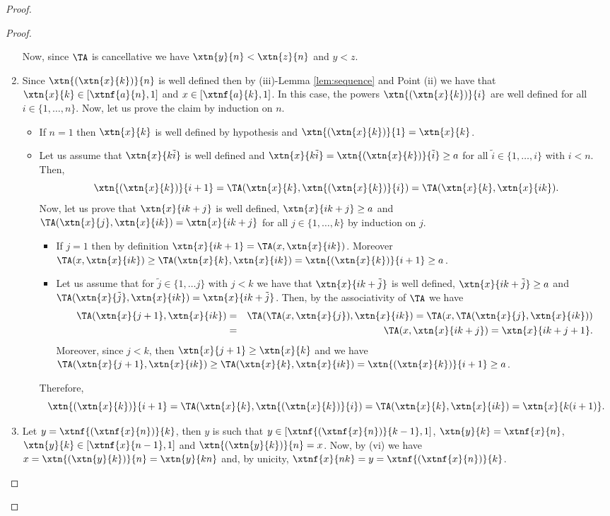 \begin{proof}
\begin{proof}
\begin{enumerate}[label=(\roman*)]
			Now, since $\TA$ is cancellative we have $\xtn{y}{n} < \xtn{z}{n}$ and $y<z$.
			\item Since $\xtn{(\xtn{x}{k})}{n}$ is well defined then by (iii)-Lemma \ref{lem:sequence} and Point (ii) we have that $\xtn{x}{k} \in [\xtnf{a}{n},1]$ and $x \in [\xtnf{a}{k},1]$. In this case, the powers $\xtn{(\xtn{x}{k})}{i}$ are well defined for all $i \in \{1,\dots,n\}$. Now, let us prove the claim by induction on $n$.
			\begin{itemize}
				\item If $n=1$ then  $\xtn{x}{k}$ is well defined by hypothesis and $\xtn{(\xtn{x}{k})}{1} = \xtn{x}{k}$.
				\item Let us assume that  $\xtn{x}{k\tilde{i}}$ is well defined and $\xtn{x}{k\tilde{i}} = \xtn{(\xtn{x}{k})}{\tilde{i}} \geq a$ for all $\tilde{i} \in \{1, \dots, i\}$ with $i <n$. Then,
				$$\xtn{(\xtn{x}{k})}{i+1} = \TA(\xtn{x}{k},\xtn{(\xtn{x}{k})}{i}) = \TA(\xtn{x}{k},\xtn{x}{ik}).$$
				Now, let us prove that $\xtn{x}{ik+j}$ is well defined, $\xtn{x}{ik+j} \geq a$ and $\TA(\xtn{x}{j}, \xtn{x}{ik}) = \xtn{x}{ik+j}$ for all $j \in \{1,\dots, k\}$ by induction on $j$.
				\begin{itemize}
					\item If $j=1$ then by definition $\xtn{x}{ik+1}=\TA(x, \xtn{x}{ik})$. Moreover $\TA(x, \xtn{x}{ik}) \geq\TA(\xtn{x}{k}, \xtn{x}{ik}) = \xtn{(\xtn{x}{k})}{i+1} \geq a$.
					\item Let us assume that for $\tilde{j} \in \{1,\dots j\}$ with $j<k$ we have that $\xtn{x}{ik+\tilde{j}}$ is well defined, $\xtn{x}{ik+\tilde{j}} \geq a$ and $\TA(\xtn{x}{\tilde{j}}, \xtn{x}{ik}) = \xtn{x}{ik+\tilde{j}}$. Then, by the associativity of $\TA$ we have
					\begin{eqnarray*}
					\TA(\xtn{x}{j+1}, \xtn{x}{ik}) &=& \TA(\TA(x,\xtn{x}{j}),\xtn{x}{ik}) = \TA(x,\TA(\xtn{x}{j},\xtn{x}{ik})) \\
					&=& \TA(x,\xtn{x}{ik+j}) = \xtn{x}{ik+j+1}.
					\end{eqnarray*}
					Moreover, since $j<k$, then $\xtn{x}{j+1}\geq \xtn{x}{k}$ and we have $\TA(\xtn{x}{j+1}, \xtn{x}{ik}) \geq\TA(\xtn{x}{k}, \xtn{x}{ik}) = \xtn{(\xtn{x}{k})}{i+1} \geq a$.
				\end{itemize}
				Therefore,
				$$\xtn{(\xtn{x}{k})}{i+1} = \TA(\xtn{x}{k}, \xtn{(\xtn{x}{k})}{i}) = \TA(\xtn{x}{k}, \xtn{x}{ik}) = \xtn{x}{k(i+1)}.$$
			\end{itemize}
			\item Let $y=\xtnf{(\xtnf{x}{n})}{k}$, then $y$ is such that $ y \in [\xtnf{(\xtnf{x}{n})}{k-1},1]$, $\xtn{y}{k}=\xtnf{x}{n}$, $\xtn{y}{k} \in [\xtnf{x}{n-1},1]$ and $\xtn{(\xtn{y}{k})}{n}=x$. Now, by (vi) we have $x=\xtn{(\xtn{y}{k})}{n}=\xtn{y}{kn}$ and, by unicity, $\xtnf{x}{nk}=y = \xtnf{(\xtnf{x}{n})}{k}$.

\end{enumerate}
\end{proof}
\end{proof}
